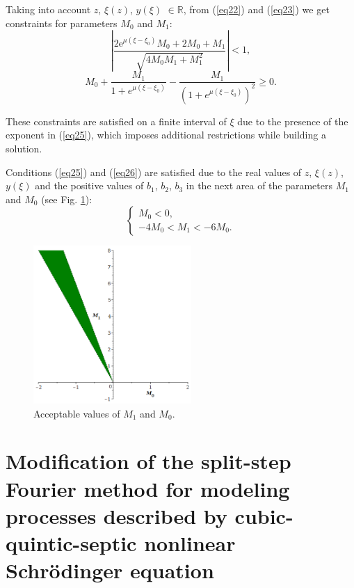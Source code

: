 \documentclass[preprint,12pt]{elsarticle}
\begin{document}
Taking into account \(z\), \(\xi (z)\), \(y(\xi)\) \(\in \mathbb{R}\), from (\ref{eq22}) and (\ref{eq23}) we get constraints for parameters \(M_{0}\) and \(M_{1}\):
\begin{equation} \label{eq25}
\left|\frac{2 {\mathrm e}^{\mu (\xi-\xi_{0})} M_{0}+2 M_{0}+M_{1}}{\sqrt{4 M_{0} M_{1}+M_{1}^{2}}}\right|< 1,
\end{equation}
\begin{equation} \label{eq26}
M_{0}+\frac{M_{1}}{1+e^{\mu(\xi-\xi_{0})}}-\frac{M_{1}}{\left(1+e^{\mu(\xi-\xi_{0})}\right)^{2}}\ge 0.
\end{equation}

These constraints are satisfied on a finite interval of \(\xi\) due to the presence of the exponent in (\ref{eq25}), which imposes additional restrictions while building a solution.

Conditions (\ref{eq25}) and (\ref{eq26}) are satisfied due to the real values of \(z\), \(\xi (z)\), \(y(\xi)\) and the positive values of \(b_{1}\), \(b_{2}\), \(b_{3}\) in the next area of the parameters \(M_{1}\) and \( M_{0}\) (see Fig. \ref{fig1}):
\begin{equation} \label{eq27}
\begin{cases}
M_{0}<0,\\
-4 M_{0} < M_{1} < -6 M_{0}.
\end{cases}
\end{equation}

\begin{figure}[H]  %
\center
\includegraphics[width=6cm,trim={0 0 0 0},clip]{fig1.png} 
\caption{Acceptable values of \(M_{1}\) and \( M_{0}.\)}
\label{fig1}
\end{figure}

\section{Modification of the split-step Fourier method for modeling processes described by cubic-quintic-septic nonlinear Schr\"{o}dinger equation}\label{ch3}
\end{document}
